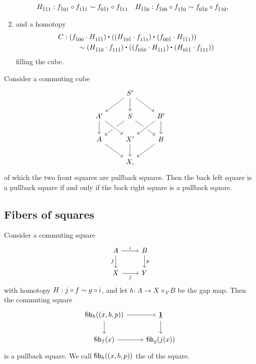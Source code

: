 \begin{defn}
\begin{enumerate}
\begin{align*}
H_{\check{1}\check{1}1} & : f_{\check{1}01}\circ f_{1\check{1}1} \sim f_{0\check{1}1}\circ f_{\check{1}11} & H_{\check{1}\check{1}0} & : f_{\check{1}00}\circ f_{1\check{1}0} \sim f_{0\check{1}0}\circ f_{\check{1}10},
\end{align*}
\item and a homotopy 
\begin{align*}
C & : \ct{(f_{\check{1}00}\cdot H_{1\check{1}\check{1}})}{(\ct{(H_{\check{1}0\check{1}}\cdot f_{1\check{1}1})}{(f_{00\check{1}}\cdot H_{\check{1}\check{1}1})})} \\
& \qquad \htpy \ct{(H_{\check{1}\check{1}0}\cdot f_{11\check{1}})}{(\ct{(f_{0\check{1}0}\cdot H_{\check{1}1\check{1}})}{(H_{0\check{1}\check{1}}\cdot f_{\check{1}11})})}
\end{align*}
filling the cube.
\end{enumerate}
\end{defn}

\begin{cor}
Consider a commuting cube
\begin{equation*}
\begin{tikzcd}
& S' \arrow[dl] \arrow[dr] \arrow[d] \\
A' \arrow[d] & S \arrow[dl] \arrow[dr] & B' \arrow[dl,crossing over] \arrow[d] \\
A \arrow[dr] & X' \arrow[d] \arrow[from=ul,crossing over] & B \arrow[dl] \\
& X,
\end{tikzcd}
\end{equation*}
of which the two front squares are pullback squares. Then the back left square is a pullback square if and only if the back right square is a pullback square.
\end{cor}

\subsection{Fibers of squares}

\begin{prp}
Consider a commuting square
\begin{equation*}
\begin{tikzcd}
A \arrow[d,swap,"f"] \arrow[r,"i"] & B \arrow[d,"g"] \\
X \arrow[r,swap,"j"] & Y
\end{tikzcd}
\end{equation*}
with homotopy $H:j\circ f\sim g\circ i$, and let $h:A \to X\times_Y B$ be the gap map.
Then the commuting square
\begin{equation*}
\begin{tikzcd}
\fib{h}{(x,b,p)} \arrow[d] \arrow[r] & \unit \arrow[d] \\
\fib{f}{x} \arrow[r] & \fib{g}{j(x)}
\end{tikzcd}
\end{equation*}
is a pullback square. We call $\mathsf{fib}_{h}((x,b,p))$ the  of the square.
\end{prp}

